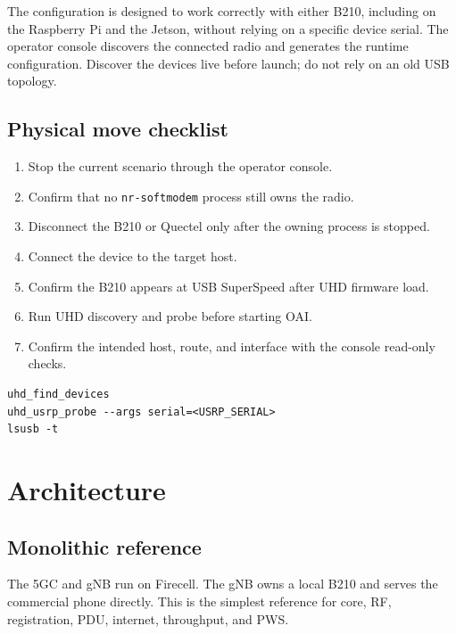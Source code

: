 \documentclass[11pt,a4paper]{article}
\begin{document}
The configuration is designed to work correctly with either B210, including on
the Raspberry Pi and the Jetson, without relying on a specific device serial.
The operator console discovers the connected radio and generates the runtime
configuration. Discover the devices live before launch; do not rely on an old
USB topology.

\subsection{Physical move checklist}

\begin{enumerate}
  \item Stop the current scenario through the operator console.
  \item Confirm that no \texttt{nr-softmodem} process still owns the radio.
  \item Disconnect the B210 or Quectel only after the owning process is stopped.
  \item Connect the device to the target host.
  \item Confirm the B210 appears at USB SuperSpeed after UHD firmware load.
  \item Run UHD discovery and probe before starting OAI.
  \item Confirm the intended host, route, and interface with the console read-only checks.
\end{enumerate}

\begin{lstlisting}
uhd_find_devices
uhd_usrp_probe --args serial=<USRP_SERIAL>
lsusb -t
\end{lstlisting}

\section{Architecture}

\subsection{Monolithic reference}

The 5GC and gNB run on Firecell. The gNB owns a local B210 and serves the
commercial phone directly. This is the simplest reference for core, RF,
registration, PDU, internet, throughput, and PWS.
\end{document}
